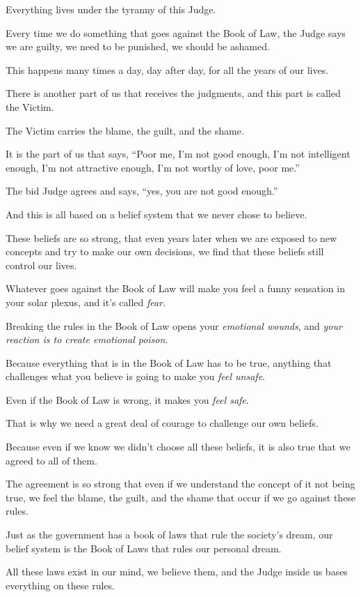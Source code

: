 \documentclass{article}
\numberwithin{equation}{section}
\begin{document}
Everything lives under the tyranny of this Judge.

Every time we do something that goes against the Book of Law, the Judge says we are guilty, we need to be punished, we should be ashamed.

This happens many times a day, day after day, for all the years of our lives.

%
There is another part of us that receives the judgments, and this part is called the Victim.

The Victim carries the blame, the guilt, and the shame.

It is the part of us that says, ``Poor me, I'm not good enough, I'm not intelligent enough, I'm not attractive enough, I'm not worthy of love, poor me.''

The bid Judge agrees and says, ``yes, you are not good enough.''

And this is all based on a belief system that we never chose to believe.

These beliefs are so strong, that even years later when we are exposed to new concepts and try to make our own decisions, we find that these beliefs still control our lives.

%
Whatever goes against the Book of Law will make you feel a funny sensation in your solar plexus, and it's called \textit{fear}.

Breaking the rules in the Book of Law opens your \textit{emotional wounds}, and \textit{your reaction is to create emotional poison}.

Because everything that is in the Book of Law has to be true, anything that challenges what you believe is going to make you \textit{feel unsafe}.

Even if the Book of Law is wrong, it makes you \textit{feel safe}.

%
That is why we need a great deal of courage to challenge our own beliefs.

Because even if we know we didn't choose all these beliefs, it is also true that we agreed to all of them.

The agreement is so strong that even if we understand the concept of it not being true, we feel the blame, the guilt, and the shame that occur if we go against these rules.

%
Just as the government has a book of laws that rule the society's dream, our belief system is the Book of Laws that rules our personal dream.

All these laws exist in our mind, we believe them, and the Judge inside us bases everything on these rules.
\end{document}
